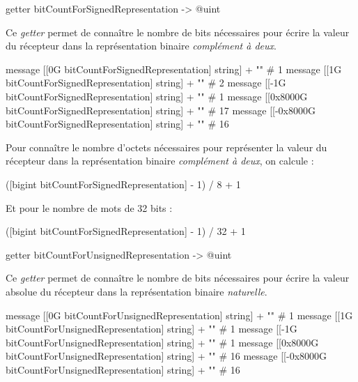 
\begin{galgasbox}
getter bitCountForSignedRepresentation -> @uint
\end{galgasbox}

Ce \emph{getter} permet de connaître le nombre de bits nécessaires pour écrire la valeur du récepteur dans la représentation binaire \emph{complément à deux}.

\begin{galgas}
message [[0G bitCountForSignedRepresentation] string] + "\n" # 1
message [[1G bitCountForSignedRepresentation] string] + "\n" # 2
message [[-1G bitCountForSignedRepresentation] string] + "\n" # 1
message [[0x8000G bitCountForSignedRepresentation] string] + "\n" # 17
message [[-0x8000G bitCountForSignedRepresentation] string] + "\n" # 16
\end{galgas}


Pour connaître le nombre d'octets nécessaires pour représenter la valeur du récepteur dans la représentation binaire \emph{complément à deux}, on calcule :
\begin{galgas}
([bigint bitCountForSignedRepresentation] - 1) / 8 + 1 
\end{galgas}

Et pour le nombre de mots de 32 bits :
\begin{galgas}
([bigint bitCountForSignedRepresentation] - 1) / 32 + 1 
\end{galgas}




\begin{galgasbox}
getter bitCountForUnsignedRepresentation -> @uint
\end{galgasbox}

Ce \emph{getter} permet de connaître le nombre de bits nécessaires pour écrire la valeur absolue du récepteur dans la représentation binaire \emph{naturelle}. 

\begin{galgas}
message [[0G bitCountForUnsignedRepresentation] string] + "\n" # 1
message [[1G bitCountForUnsignedRepresentation] string] + "\n" # 1
message [[-1G bitCountForUnsignedRepresentation] string] + "\n" # 1
message [[0x8000G bitCountForUnsignedRepresentation] string] + "\n" # 16
message [[-0x8000G bitCountForUnsignedRepresentation] string] + "\n" # 16
\end{galgas}

